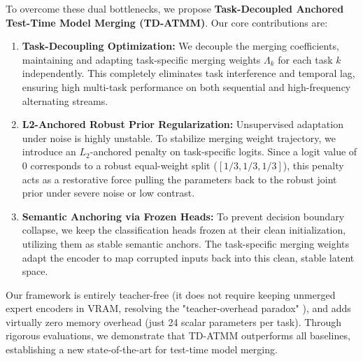 \documentclass{article}
\theoremstyle{plain}
\theoremstyle{definition}
\theoremstyle{remark}
\begin{document}
To overcome these dual bottlenecks, we propose \textbf{Task-Decoupled Anchored Test-Time Model Merging (TD-ATMM)}. Our core contributions are:
\begin{enumerate}
    \item \textbf{Task-Decoupling Optimization:} We decouple the merging coefficients, maintaining and adapting task-specific merging weights $\Lambda_k$ for each task $k$ independently. This completely eliminates task interference and temporal lag, ensuring high multi-task performance on both sequential and high-frequency alternating streams.
    \item \textbf{L2-Anchored Robust Prior Regularization:} Unsupervised adaptation under noise is highly unstable. To stabilize merging weight trajectory, we introduce an $L_2$-anchored penalty on task-specific logits. Since a logit value of 0 corresponds to a robust equal-weight split ($[1/3, 1/3, 1/3]$), this penalty acts as a restorative force pulling the parameters back to the robust joint prior under severe noise or low contrast.
    \item \textbf{Semantic Anchoring via Frozen Heads:} To prevent decision boundary collapse, we keep the classification heads frozen at their clean initialization, utilizing them as stable semantic anchors. The task-specific merging weights adapt the encoder to map corrupted inputs back into this clean, stable latent space.
\end{enumerate}

Our framework is entirely teacher-free (it does not require keeping unmerged expert encoders in VRAM, resolving the "teacher-overhead paradox" \cite{s2cmerge2026}), and adds virtually zero memory overhead (just 24 scalar parameters per task). Through rigorous evaluations, we demonstrate that TD-ATMM outperforms all baselines, establishing a new state-of-the-art for test-time model merging.
\end{document}
